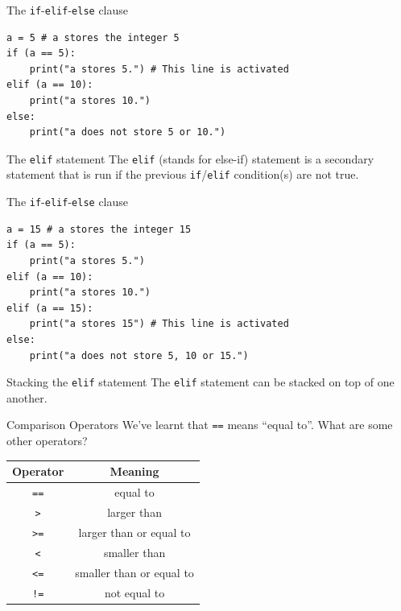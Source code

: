 \documentclass[dvipsnames, svgnames, x11names]{beamer}
\begin{document}
\begin{frame}[fragile]{The \texttt{if}-\texttt{elif}-\texttt{else} clause}
\begin{verbatim}
a = 5 # a stores the integer 5
if (a == 5):
	print("a stores 5.") # This line is activated
elif (a == 10):
	print("a stores 10.")
else:
	print("a does not store 5 or 10.") 
\end{verbatim}
\begin{block}{The \texttt{elif} statement}
The \texttt{elif} (stands for else-if) statement is a secondary  statement that is run if the previous \texttt{if}/\texttt{elif} condition(s) are not true.
\end{block}
\end{frame}

\begin{frame}[fragile]{The \texttt{if}-\texttt{elif}-\texttt{else} clause}
\begin{verbatim}
a = 15 # a stores the integer 15
if (a == 5):
	print("a stores 5.") 
elif (a == 10):
	print("a stores 10.")
elif (a == 15):
	print("a stores 15") # This line is activated
else:
	print("a does not store 5, 10 or 15.") 
\end{verbatim}
\begin{block}{Stacking the \texttt{elif} statement}
The \texttt{elif} statement can be stacked on top of one another.
\end{block}
\end{frame}

\begin{frame}[fragile]{Comparison Operators}
We've learnt that \texttt{==} means ``equal to''. What are some other operators?
\begin{center}
\begin{tabular}{|c|c|}\hline
Operator & Meaning\\\hline
\texttt{==} & equal to\\\hline
\texttt{>} & larger than\\\hline
\texttt{>=} & larger than or equal to\\\hline
\texttt{<} & smaller than\\\hline
\texttt{<=} & smaller than or equal to\\\hline
\texttt{!=} & not equal to\\\hline
\end{tabular}
\end{center}
\end{frame}
\end{document}

